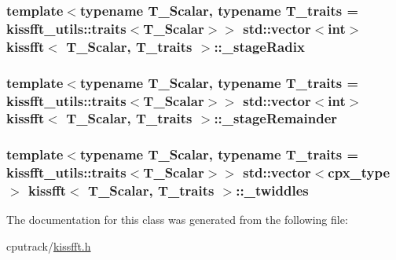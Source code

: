\subsubsection[{\texorpdfstring{\+\_\+stage\+Radix}{_stageRadix}}]{\setlength{\rightskip}{0pt plus 5cm}template$<$typename T\+\_\+\+Scalar, typename T\+\_\+traits = kissfft\+\_\+utils\+::traits$<$\+T\+\_\+\+Scalar$>$$>$ std\+::vector$<$int$>$ {\bf kissfft}$<$ T\+\_\+\+Scalar, T\+\_\+traits $>$\+::\+\_\+stage\+Radix\hspace{0.3cm}{\ttfamily [private]}}\hypertarget{classkissfft_a89d4645ae457422179835a92f2e4bf7c}{}\label{classkissfft_a89d4645ae457422179835a92f2e4bf7c}
\subsubsection[{\texorpdfstring{\+\_\+stage\+Remainder}{_stageRemainder}}]{\setlength{\rightskip}{0pt plus 5cm}template$<$typename T\+\_\+\+Scalar, typename T\+\_\+traits = kissfft\+\_\+utils\+::traits$<$\+T\+\_\+\+Scalar$>$$>$ std\+::vector$<$int$>$ {\bf kissfft}$<$ T\+\_\+\+Scalar, T\+\_\+traits $>$\+::\+\_\+stage\+Remainder\hspace{0.3cm}{\ttfamily [private]}}\hypertarget{classkissfft_a112fd0185ddaaf837cab9e7abb839d13}{}\label{classkissfft_a112fd0185ddaaf837cab9e7abb839d13}
\subsubsection[{\texorpdfstring{\+\_\+twiddles}{_twiddles}}]{\setlength{\rightskip}{0pt plus 5cm}template$<$typename T\+\_\+\+Scalar, typename T\+\_\+traits = kissfft\+\_\+utils\+::traits$<$\+T\+\_\+\+Scalar$>$$>$ std\+::vector$<${\bf cpx\+\_\+type}$>$ {\bf kissfft}$<$ T\+\_\+\+Scalar, T\+\_\+traits $>$\+::\+\_\+twiddles\hspace{0.3cm}{\ttfamily [private]}}\hypertarget{classkissfft_abd5d6e3a0d08f56c711590d890fdd740}{}\label{classkissfft_abd5d6e3a0d08f56c711590d890fdd740}


The documentation for this class was generated from the following file\+:\begin{DoxyCompactItemize}
\item 
cputrack/\hyperlink{kissfft_8h}{kissfft.\+h}\end{DoxyCompactItemize}
